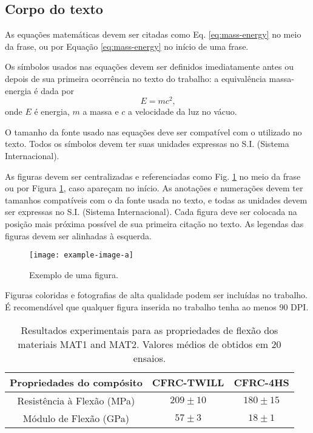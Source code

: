 \documentclass[
	article,			%
	10pt,				%
	oneside,			%
	a4paper,			%
  twocolumn,			%
	english,			%
	brazil,				%
	sumario=tradicional,
	]{abntex2}
\begin{document}
\subsection{Corpo do texto}

As equações matemáticas devem ser citadas como Eq. \ref{eq:mass-energy} no meio da
frase, ou por Equação \ref{eq:mass-energy} no início de uma frase.

Os símbolos usados nas equações devem ser definidos imediatamente antes ou depois de sua
primeira ocorrência no texto do trabalho: a equivalência massa-energia é dada por
\begin{equation}
  \label{eq:mass-energy}
  E = m c^2\mbox{,}
\end{equation}
onde $E$ é energia, $m$ a massa e $c$ a velocidade da luz no vácuo.

O tamanho da fonte usado nas equações deve ser compatível com o utilizado no texto. Todos
os símbolos devem ter suas unidades expressas no S.I. (Sistema Internacional).

As figuras devem ser centralizadas e referenciadas como Fig. \ref{fig:example} no meio da
frase ou por Figura \ref{fig:example}, caso apareçam no início. As anotações e numerações
devem ter tamanhos compatíveis com o da fonte usada no texto, e todas as unidades devem
ser expressas no S.I. (Sistema Internacional). Cada figura deve ser colocada na posição
mais próxima possível de sua primeira citação no texto. As legendas das figuras devem ser
alinhadas à esquerda.

\begin{figure}[h]
  \begin{center}
    \texttt{[image: example-image-a]}
  \end{center}
  \caption{Exemplo de uma figura.}
  \label{fig:example}
\end{figure}

Figuras coloridas e fotografias de alta qualidade podem ser incluídas no trabalho. É
recomendável que qualquer figura inserida no trabalho tenha ao menos 90 DPI.

\begin{table*}[t]
  \caption{Resultados experimentais para as propriedades de flexão dos materiais MAT1 and
  MAT2. Valores médios de obtidos em 20 ensaios.}
  \label{tab:large}
  \centering
  \begin{tabular}{ccc}
    \toprule
    Propriedades do compósito & CFRC-TWILL & CFRC-4HS \\
    \midrule
    Resistência à Flexão (MPa) & $209\pm10$ & $180\pm15$ \\
    Módulo de Flexão (GPa) & $57\pm3$ & $18\pm1$ \\
    \bottomrule
  \end{tabular}
\end{table*}
\end{document}
